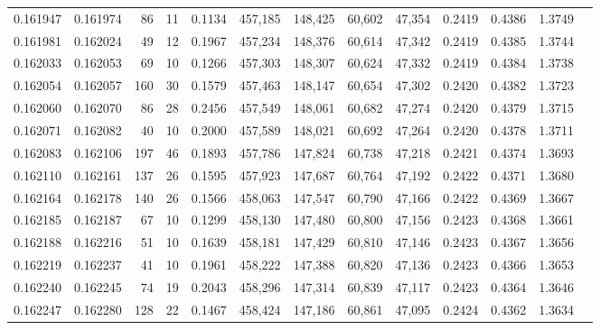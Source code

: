 \begin{tabular}{rrrrrrrrrrrrr}
0.161947 & 0.161974 &    86 &  11 &                                     0.1134 & 457,185 & 148,425 &  60,602 &  47,354 & 0.2419 & 0.4386 & 1.3749 \\
0.161981 & 0.162024 &    49 &  12 &                                     0.1967 & 457,234 & 148,376 &  60,614 &  47,342 & 0.2419 & 0.4385 & 1.3744 \\
0.162033 & 0.162053 &    69 &  10 &                                     0.1266 & 457,303 & 148,307 &  60,624 &  47,332 & 0.2419 & 0.4384 & 1.3738 \\
0.162054 & 0.162057 &   160 &  30 &                                     0.1579 & 457,463 & 148,147 &  60,654 &  47,302 & 0.2420 & 0.4382 & 1.3723 \\
0.162060 & 0.162070 &    86 &  28 &                                     0.2456 & 457,549 & 148,061 &  60,682 &  47,274 & 0.2420 & 0.4379 & 1.3715 \\
0.162071 & 0.162082 &    40 &  10 &                                     0.2000 & 457,589 & 148,021 &  60,692 &  47,264 & 0.2420 & 0.4378 & 1.3711 \\
0.162083 & 0.162106 &   197 &  46 &                                     0.1893 & 457,786 & 147,824 &  60,738 &  47,218 & 0.2421 & 0.4374 & 1.3693 \\
0.162110 & 0.162161 &   137 &  26 &                                     0.1595 & 457,923 & 147,687 &  60,764 &  47,192 & 0.2422 & 0.4371 & 1.3680 \\
0.162164 & 0.162178 &   140 &  26 &                                     0.1566 & 458,063 & 147,547 &  60,790 &  47,166 & 0.2422 & 0.4369 & 1.3667 \\
0.162185 & 0.162187 &    67 &  10 &                                     0.1299 & 458,130 & 147,480 &  60,800 &  47,156 & 0.2423 & 0.4368 & 1.3661 \\
0.162188 & 0.162216 &    51 &  10 &                                     0.1639 & 458,181 & 147,429 &  60,810 &  47,146 & 0.2423 & 0.4367 & 1.3656 \\
0.162219 & 0.162237 &    41 &  10 &                                     0.1961 & 458,222 & 147,388 &  60,820 &  47,136 & 0.2423 & 0.4366 & 1.3653 \\
0.162240 & 0.162245 &    74 &  19 &                                     0.2043 & 458,296 & 147,314 &  60,839 &  47,117 & 0.2423 & 0.4364 & 1.3646 \\
0.162247 & 0.162280 &   128 &  22 &                                     0.1467 & 458,424 & 147,186 &  60,861 &  47,095 & 0.2424 & 0.4362 & 1.3634 \\

\end{tabular}

